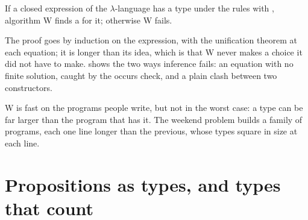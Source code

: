 \label{lst:b3:type-systems:infer}

\label{lst:b3:type-systems:poly}

\label{out:b3:type-systems:poly}

\begin{theorem}\label{thm:b3:type-systems:principal}
If a closed expression of the $\lambda$-language has a type under the rules with , algorithm W finds a  for it; otherwise W fails.
\end{theorem}

\admitted

The proof goes by induction on the expression, with the unification theorem at each equation; it is longer than its idea, which is that W never makes a choice it did not have to make.  shows the two ways inference fails: an equation with no finite solution, caught by the occurs check, and a plain clash between two constructors.

\label{out:b3:type-systems:occurs}

W is fast on the programs people write, but not in the worst case: a type can be far larger than the program that has it. The weekend problem builds a family of programs, each one line longer than the previous, whose types square in size at each line.

\section{Propositions as types, and types that count}\label{sec:b3:type-systems:curry-howard}

